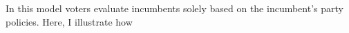 \documentclass[hyphens, crop=false]{standalone}
\begin{document}
	In this model voters evaluate incumbents solely based on the incumbent's party policies.	
	Here, I illustrate how 
	
	
	
	
	
	
	
	
	
	
	
	
	
	
	
	
	
	
	
	

		
	
	
\end{document}
